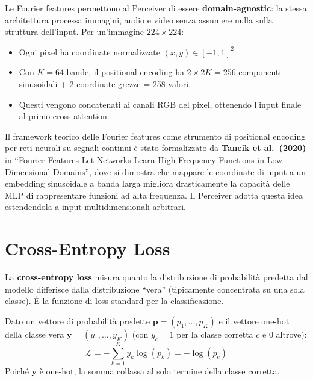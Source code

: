 \documentclass[
  11pt,
]{article}
\begin{document}
\begin{notabox}[title={\textbf{Fourier features nel Perceiver IO}}]
Le Fourier features permettono al Perceiver di essere \textbf{domain-agnostic}: la stessa architettura processa immagini, audio e video senza assumere nulla sulla struttura dell'input. Per un'immagine $224 \times 224$:
\begin{itemize}
  \item Ogni pixel ha coordinate normalizzate $(x, y) \in [-1,1]^2$.
  \item Con $K=64$ bande, il positional encoding ha $2 \times 2K = 256$ componenti sinusoidali + 2 coordinate grezze = 258 valori.
  \item Questi vengono concatenati ai canali RGB del pixel, ottenendo l'input finale al primo cross-attention.
\end{itemize}
Il framework teorico delle Fourier features come strumento di positional encoding per reti neurali su segnali continui è stato formalizzato da \textbf{Tancik et al.\ (2020)} in ``Fourier Features Let Networks Learn High Frequency Functions in Low Dimensional Domains'', dove si dimostra che mappare le coordinate di input a un embedding sinusoidale a banda larga migliora drasticamente la capacità delle MLP di rappresentare funzioni ad alta frequenza. Il Perceiver adotta questa idea estendendola a input multidimensionali arbitrari.
\end{notabox}

\section{Cross-Entropy Loss}
\label{app:cross-entropy}

La \textbf{cross-entropy loss} misura quanto la distribuzione di probabilità predetta dal modello differisce dalla distribuzione ``vera'' (tipicamente concentrata su una sola classe). È la funzione di loss standard per la classificazione.

\begin{formulabox}[title={\textbf{Cross-Entropy Loss}}]
Dato un vettore di probabilità predette $\mathbf{p} = (p_1, \ldots, p_K)$ e il vettore one-hot della classe vera $\mathbf{y} = (y_1, \ldots, y_K)$ (con $y_c = 1$ per la classe corretta $c$ e 0 altrove):
\[
\mathcal{L} = -\sum_{k=1}^{K} y_k \log(p_k) = -\log(p_c)
\]
Poiché $\mathbf{y}$ è one-hot, la somma collassa al solo termine della classe corretta.
\end{formulabox}
\end{document}
